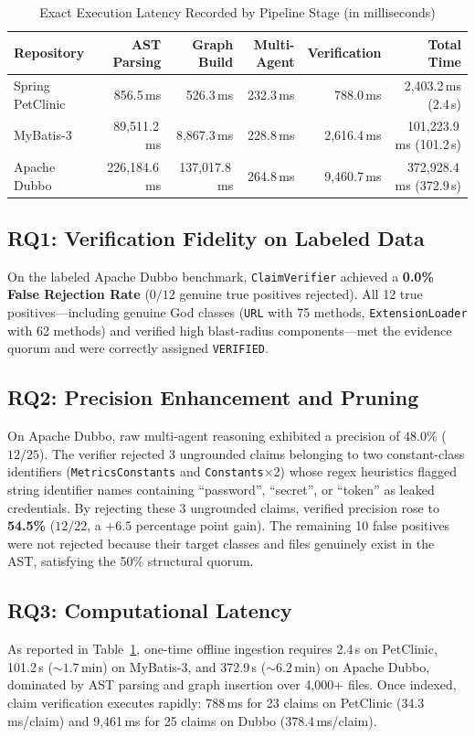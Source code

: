 \documentclass[runningheads]{llncs}
\begin{document}
\begin{table}[t]
\centering
\caption{Exact Execution Latency Recorded by Pipeline Stage (in milliseconds)}
\label{tab:latency}
\begin{tabular}{lrrrrr}
\toprule
\textbf{Repository} & \textbf{AST Parsing} & \textbf{Graph Build} & \textbf{Multi-Agent} & \textbf{Verification} & \textbf{Total Time} \\
\midrule
Spring PetClinic & 856.5\,ms & 526.3\,ms & 232.3\,ms & 788.0\,ms & 2,403.2\,ms (2.4\,s) \\
MyBatis-3 & 89,511.2\,ms & 8,867.3\,ms & 228.8\,ms & 2,616.4\,ms & 101,223.9\,ms (101.2\,s) \\
Apache Dubbo & 226,184.6\,ms & 137,017.8\,ms & 264.8\,ms & 9,460.7\,ms & 372,928.4\,ms (372.9\,s) \\
\bottomrule
\end{tabular}
\end{table}

\subsection{RQ1: Verification Fidelity on Labeled Data}
On the labeled Apache Dubbo benchmark, \texttt{ClaimVerifier} achieved a \textbf{0.0\% False Rejection Rate} ($0 / 12$ genuine true positives rejected). All 12 true positives---including genuine God classes (\texttt{URL} with 75 methods, \texttt{ExtensionLoader} with 62 methods) and verified high blast-radius components---met the evidence quorum and were correctly assigned \texttt{VERIFIED}.

\subsection{RQ2: Precision Enhancement and Pruning}
On Apache Dubbo, raw multi-agent reasoning exhibited a precision of $48.0\%$ ($12 / 25$). The verifier rejected 3 ungrounded claims belonging to two constant-class identifiers (\texttt{MetricsConstants} and \texttt{Constants}$\times$2) whose regex heuristics flagged string identifier names containing ``password'', ``secret'', or ``token'' as leaked credentials. By rejecting these 3 ungrounded claims, verified precision rose to \textbf{54.5\%} ($12 / 22$, a $+6.5$ percentage point gain). The remaining 10 false positives were not rejected because their target classes and files genuinely exist in the AST, satisfying the 50\% structural quorum.

\subsection{RQ3: Computational Latency}
As reported in Table~\ref{tab:latency}, one-time offline ingestion requires 2.4\,s on PetClinic, 101.2\,s ($\sim 1.7$\,min) on MyBatis-3, and 372.9\,s ($\sim 6.2$\,min) on Apache Dubbo, dominated by AST parsing and graph insertion over 4,000+ files. Once indexed, claim verification executes rapidly: 788\,ms for 23 claims on PetClinic (34.3\,ms/claim) and 9,461\,ms for 25 claims on Dubbo (378.4\,ms/claim).
\end{document}
